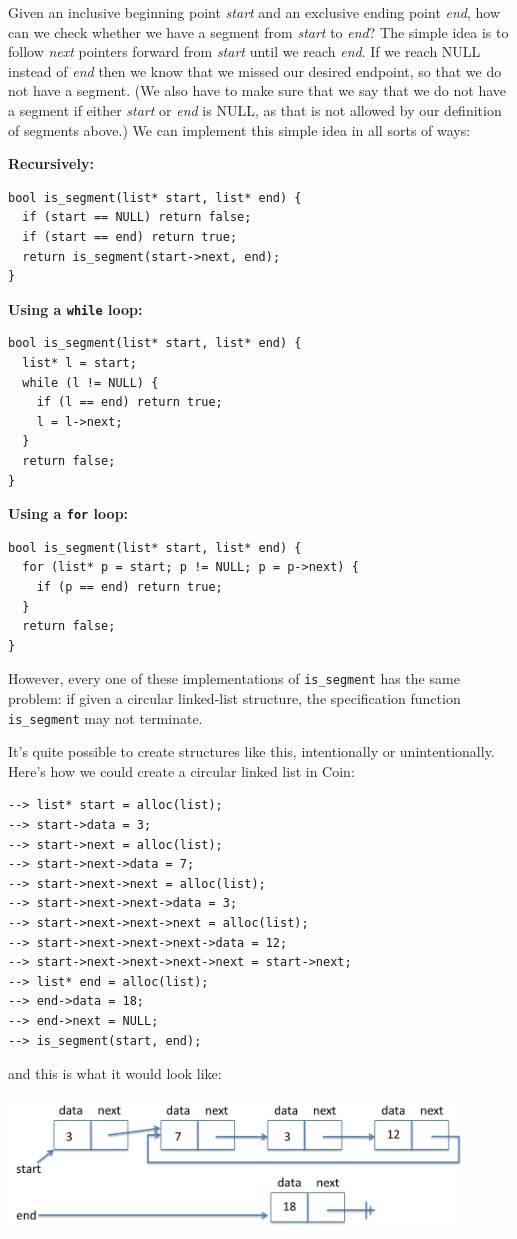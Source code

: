 Given an inclusive beginning point \emph{start} and an exclusive
ending point \emph{end}, how can we check whether we have a segment
from \emph{start} to \emph{end}?  The simple idea is to follow
\emph{next} pointers forward from \emph{start} until we reach
\emph{end}. If we reach NULL instead of \emph{end} then we know that
we missed our desired endpoint, so that we do not have a segment. (We
also have to make sure that we say that we do not have a segment if
either \emph{start} or \emph{end} is NULL, as that is not allowed by
our definition of segments above.) We can implement this simple idea
in all sorts of ways:

\bigskip
\noindent
\textbf{Recursively:}
\begin{lstlisting}[language={[C0]C}]
bool is_segment(list* start, list* end) {
  if (start == NULL) return false;
  if (start == end) return true;
  return is_segment(start->next, end);
}
\end{lstlisting}

\medskip
\noindent
\textbf{Using a \lstinline'while' loop:}

\begin{lstlisting}[language={[C0]C}]
bool is_segment(list* start, list* end) {
  list* l = start;
  while (l != NULL) {
    if (l == end) return true;
    l = l->next;
  }
  return false;
}
\end{lstlisting}
\medskip
\noindent
\textbf{Using a \lstinline'for' loop:}

\begin{lstlisting}[language={[C0]C}]
bool is_segment(list* start, list* end) {
  for (list* p = start; p != NULL; p = p->next) {
    if (p == end) return true;
  }
  return false;
}
\end{lstlisting}
However, every one of these implementations of \lstinline'is_segment' has
the same problem: if given a circular linked-list structure, the
specification function \lstinline'is_segment' may not terminate.

It's quite possible to create structures like this, intentionally or
unintentionally. Here's how we could create a circular linked list in
Coin:
\begin{lstlisting}[language={[coin]C}]
--> list* start = alloc(list);
--> start->data = 3;
--> start->next = alloc(list);
--> start->next->data = 7;
--> start->next->next = alloc(list);
--> start->next->next->data = 3;
--> start->next->next->next = alloc(list);
--> start->next->next->next->data = 12;
--> start->next->next->next->next = start->next;
--> list* end = alloc(list);
--> end->data = 18;
--> end->next = NULL;
--> is_segment(start, end);
\end{lstlisting}
and this is what it would look like:
\begin{center}
\includegraphics[width=0.9\textwidth]{img/linkedlist-circle.png}
\end{center}


